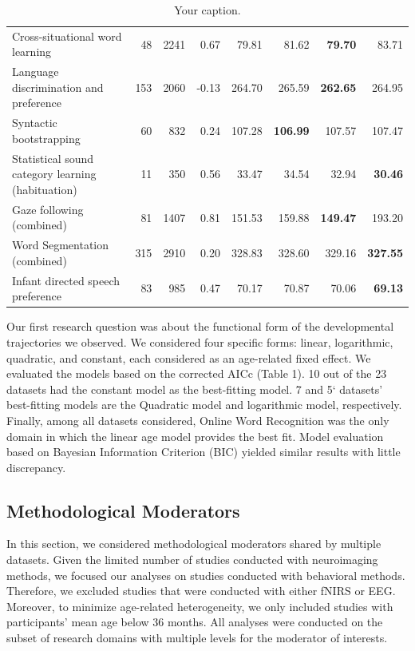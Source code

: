 \documentclass[10pt, letterpaper]{article}
\begin{document}
\begin{table}
\begin{tabular}{l|r|r|r|r|r|r|r}
Cross-situational word learning & 48 & 2241 & 0.67 & 79.81 & 81.62 & \textbf{79.70} & 83.71\\
Language discrimination and preference & 153 & 2060 & -0.13 & 264.70 & 265.59 & \textbf{262.65} & 264.95\\
Syntactic bootstrapping & 60 & 832 & 0.24 & 107.28 & \textbf{106.99} & 107.57 & 107.47\\
Statistical sound category learning (habituation) & 11 & 350 & 0.56 & 33.47 & 34.54 & 32.94 & \textbf{30.46}\\
Gaze following (combined) & 81 & 1407 & 0.81 & 151.53 & 159.88 & \textbf{149.47} & 193.20\\
Word Segmentation (combined) & 315 & 2910 & 0.20 & 328.83 & 328.60 & 329.16 & \textbf{327.55}\\
Infant directed speech preference & 83 & 985 & 0.47 & 70.17 & 70.87 & 70.06 & \textbf{69.13}\\
\hline
\end{tabular}
\caption{\label{demo-table}Your caption.}
\end{table}

Our first research question was about the functional form of the
developmental trajectories we observed. We considered four specific
forms: linear, logarithmic, quadratic, and constant, each considered as
an age-related fixed effect. We evaluated the models based on the
corrected AICc (Table 1). 10 out of the 23 datasets had the constant
model as the best-fitting model. 7 and 5` datasets' best-fitting models
are the Quadratic model and logarithmic model, respectively. Finally,
among all datasets considered, Online Word Recognition was the only
domain in which the linear age model provides the best fit. Model
evaluation based on Bayesian Information Criterion (BIC) yielded similar
results with little discrepancy.

\hypertarget{methodological-moderators}{%
\subsection{Methodological Moderators}\label{methodological-moderators}}

In this section, we considered methodological moderators shared by
multiple datasets. Given the limited number of studies conducted with
neuroimaging methods, we focused our analyses on studies conducted with
behavioral methods. Therefore, we excluded studies that were conducted
with either fNIRS or EEG. Moreover, to minimize age-related
heterogeneity, we only included studies with participants' mean age
below 36 months. All analyses were conducted on the subset of research
domains with multiple levels for the moderator of interests.
\end{document}
